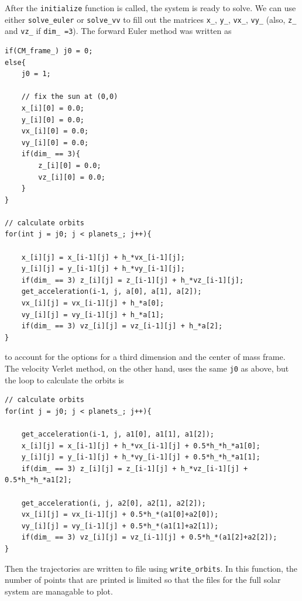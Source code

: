 \documentclass[prb,aps,twocolumn,showpacs,10pt]{revtex4-1}
\begin{document}
After the \texttt{initialize} function is called, the system is ready to solve. We can use either \texttt{solve\_euler} or \texttt{solve\_vv} to fill out the matrices \texttt{x\_}, \texttt{y\_}, \texttt{vx\_}, \texttt{vy\_} (also, \texttt{z\_} and \texttt{vz\_} if \texttt{dim\_ =3}). The forward Euler method was written as
\begin{lstlisting}
if(CM_frame_) j0 = 0;
else{
	j0 = 1;

	// fix the sun at (0,0)
	x_[i][0] = 0.0;
	y_[i][0] = 0.0;
	vx_[i][0] = 0.0;
	vy_[i][0] = 0.0;
	if(dim_ == 3){
		z_[i][0] = 0.0;
		vz_[i][0] = 0.0;
	}			
}

// calculate orbits
for(int j = j0; j < planets_; j++){

	x_[i][j] = x_[i-1][j] + h_*vx_[i-1][j];
	y_[i][j] = y_[i-1][j] + h_*vy_[i-1][j];
	if(dim_ == 3) z_[i][j] = z_[i-1][j] + h_*vz_[i-1][j];
	get_acceleration(i-1, j, a[0], a[1], a[2]);
	vx_[i][j] = vx_[i-1][j] + h_*a[0];
	vy_[i][j] = vy_[i-1][j] + h_*a[1];
	if(dim_ == 3) vz_[i][j] = vz_[i-1][j] + h_*a[2];
}
\end{lstlisting}
to account for the options for a third dimension and the center of mass frame. The velocity Verlet method, on the other hand, uses the same \texttt{j0} as above, but the loop to calculate the orbits is
\begin{lstlisting}
// calculate orbits
for(int j = j0; j < planets_; j++){

	get_acceleration(i-1, j, a1[0], a1[1], a1[2]);
	x_[i][j] = x_[i-1][j] + h_*vx_[i-1][j] + 0.5*h_*h_*a1[0];
	y_[i][j] = y_[i-1][j] + h_*vy_[i-1][j] + 0.5*h_*h_*a1[1];
	if(dim_ == 3) z_[i][j] = z_[i-1][j] + h_*vz_[i-1][j] + 0.5*h_*h_*a1[2];

	get_acceleration(i, j, a2[0], a2[1], a2[2]);
	vx_[i][j] = vx_[i-1][j] + 0.5*h_*(a1[0]+a2[0]);
	vy_[i][j] = vy_[i-1][j] + 0.5*h_*(a1[1]+a2[1]);
	if(dim_ == 3) vz_[i][j] = vz_[i-1][j] + 0.5*h_*(a1[2]+a2[2]);
}	
\end{lstlisting}


Then the trajectories are written to file using \texttt{write\_orbits}. In this function, the number of points that are printed is limited so that the files for the full solar system are managable to plot. \\
\end{document}
